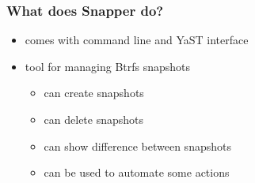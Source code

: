 \documentclass{beamer}
\begin{document}

\begin{frame}[t]
\frametitle{What does Snapper do?}
\begin{itemize}
   \item comes with command line and YaST interface
   \item tool for managing Btrfs snapshots
   \begin{itemize}
      \item can create snapshots
      \item can delete snapshots
      \item can show difference between snapshots
      \item can be used to automate some actions
   \end{itemize}
\end{itemize}
\end{frame}
\end{document}
